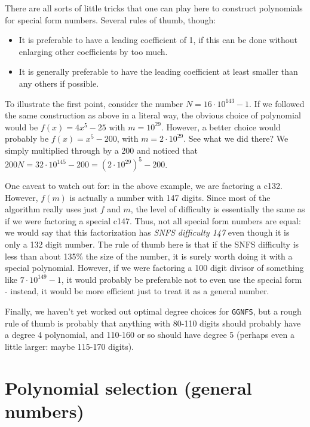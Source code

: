 \documentclass[12pt]{article}
\begin{document}
  There are all sorts of little tricks that one can play here to construct
  polynomials for special form numbers. Several rules of thumb, though:
  \begin{itemize}
    \item
      It is preferable to have a leading coefficient of 1, if this can
      be done without enlarging other coefficients by too much.
    \item
      It is generally preferable to have the leading coefficient at least
      smaller than any others if possible.
  \end{itemize}
  To illustrate the first point, consider the number
  $N=16\cdot 10^{143}-1$.
  If we followed the same construction as above in a literal way,
  the obvious choice of polynomial would be $f(x)=4x^5-25$ with
  $m=10^{29}$. However, a better choice would probably be
  $f(x)=x^5-200$, with $m=2\cdot10^{29}$. See what we did there?
  We simply multiplied through by a 200 and noticed that
  $200N = 32\cdot 10^{145} - 200 = (2\cdot 10^{29})^5 - 200$.

  One caveat to watch out for: in the above example, we are factoring a c132.
  However, $f(m)$ is actually a number with 147 digits. Since most
  of the algorithm really uses just $f$ and $m$, the level of difficulty
  is essentially the same as if we were factoring a special c147.
  Thus, not all special form numbers are equal: we would say that this
  factorization has {\em SNFS difficulty 147} even though it is only
  a 132 digit number. The rule of thumb here is that if the SNFS difficulty
  is less than about 135\% the size of the number, it is surely worth
  doing it with a special polynomial. However, if we were factoring a 
  100 digit divisor of something like $7\cdot 10^{149}-1$, it would
  probably be preferable not to even use the special form - instead,
  it would be more efficient just to treat it as a general number.

  Finally, we haven't yet worked out optimal degree choices
  for {\tt GGNFS}, but a rough rule of thumb is probably that anything with 80-110
  digits should probably have a degree 4 polynomial, and 110-160 or so should
  have degree 5 (perhaps even a little larger: maybe 115-170 digits).

\section{Polynomial selection (general numbers)}
\end{document}
